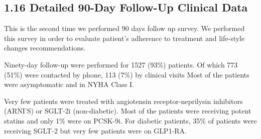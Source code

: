 \documentclass[
]{article}
\begin{document}
\pagebreak

\subsection{1.16 Detailed 90-Day Follow-Up Clinical
Data}\label{detailed-90-day-follow-up-clinical-data}

This is the second time we performed 90 days follow up survey. We
performed this survey in order to evaluate patient's adherence to
treatment and life-style changes recommendations.

Ninety-day follow-up were performed for 1527 (93\%) patients. Of which
773 (51\%) were contacted by phone, 113 (7\%) by clinical visits Most of
the patients were asymptomatic and in NYHA Class I.

Very few patients were treated with angiotensin receptor-neprilysin
inhibitors (ARNI'S) or SGLT-2i (non-diabetic). Most of the patients were
receiving potent statins and only 1\% were on PCSK-9i. For diabetic
patients, 35\% of patients were receiving SGLT-2 but very few patients
were on GLP1-RA.

~
\end{document}
